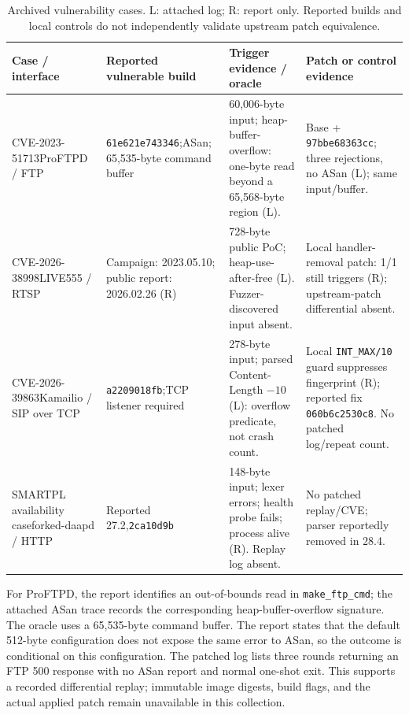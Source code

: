 \begin{table}[!tbp]
\centering\small
\caption{Archived vulnerability cases. L: attached log; R: report only. Reported builds and local controls do not independently validate upstream patch equivalence.}
\label{tab:cve}
\begin{tabularx}{\textwidth}{@{}>{\raggedright\arraybackslash}p{} >{\raggedright\arraybackslash}p{} Y Y@{}}
\toprule
Case / interface & Reported vulnerable build & Trigger evidence / oracle & Patch or control evidence \\
\midrule
\mbox{CVE-2023-51713}\newline ProFTPD / FTP & \texttt{61e621e743346};\newline ASan; 65,535-byte command buffer & 60,006-byte input; heap-buffer-overflow: one-byte read beyond a 65,568-byte region (L). & Base + \texttt{97bbe68363cc}; three rejections, no ASan (L); same input/buffer. \\
\addlinespace[3pt]
\mbox{CVE-2026-38998}\newline LIVE555 / RTSP & Campaign: 2023.05.10; public report: 2026.02.26 (R) & 728-byte public PoC; heap-use-after-free (L). Fuzzer-discovered input absent. & Local handler-removal patch: 1/1 still triggers (R); upstream-patch differential absent. \\
\addlinespace[3pt]
\mbox{CVE-2026-39863}\newline Kamailio / SIP over TCP & \texttt{a2209018fb};\newline TCP listener required & 278-byte input; parsed Content-Length $-10$ (L): overflow predicate, not crash count. & Local \texttt{INT\_MAX/10} guard suppresses fingerprint (R); reported fix \texttt{060b6c2530c8}. No patched log/repeat count. \\
\addlinespace[3pt]
SMARTPL availability case\newline forked-daapd / HTTP & Reported 27.2,\newline \texttt{2ca10d9b} & 148-byte input; lexer errors; health probe fails; process alive (R). Replay log absent. & No patched replay/CVE; parser reportedly removed in 28.4. \\
\bottomrule
\end{tabularx}
\end{table}

For ProFTPD, the report identifies an out-of-bounds read in \texttt{make\_ftp\_cmd}; the attached ASan trace records the corresponding heap-buffer-overflow signature. The oracle uses a 65,535-byte command buffer. The report states that the default 512-byte configuration does not expose the same error to ASan, so the outcome is conditional on this configuration. The patched log lists three rounds returning an FTP 500 response with no ASan report and normal one-shot exit. This supports a recorded differential replay; immutable image digests, build flags, and the actual applied patch remain unavailable in this collection.

